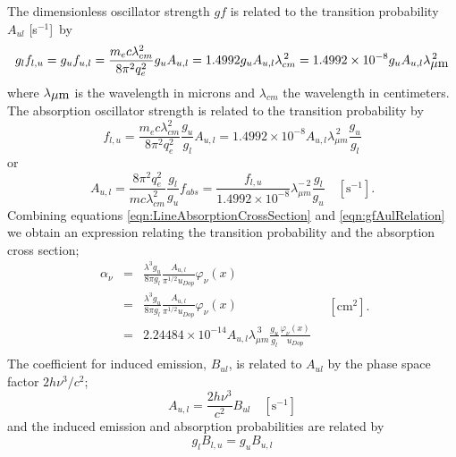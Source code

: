 The dimensionless oscillator strength $gf$ is related to the transition
probability $A_{ul}$ [s$^{-1}$]~by
\begin{equation}
{g_l}{f_{l,u}} = {g_u}{f_{u,l}} = \frac{{{m_e}c\lambda _{cm}^2}}{{8{\pi
^2}q_e^2}}{g_u}{A_{u,l}} = 1.4992{g_u}{A_{u,l}}\lambda _{cm}^{\,2} = 1.4992
\times {10^{ - 8}}{g_u}{A_{u,l}}\lambda _{\hbox{$\mu$m}}^{\,2}
\end{equation}
where $\lambda_{\hbox{$\mu$m}}$ is the wavelength in microns and $\lambda_{cm}$ the wavelength in centimeters.
The absorption oscillator strength is related to the
transition probability by
\begin{equation}
\label{eqn:gfAulRelation}
{f_{l,u}} = \frac{{{m_e}c\lambda _{cm}^2}}{{8{\pi
^2}q_e^2}}\frac{{{g_u}}}{{{g_l}}}{A_{u,l}} = 1.4992 \times {10^{ -
8}}{A_{u,l}}\lambda _{\mu m}^{\,2}\frac{{{g_u}}}{{{g_l}}}
\end{equation}
or
\begin{equation}
{A_{u,l}} = \frac{{8{\pi ^2}q_e^2}}{{mc\lambda
_{cm}^2}}\frac{{{g_l}}}{{{g_u}}}{f_{abs}} = \frac{{{f_{l,u}}}}{{1.4992 \times
{{10}^{ - 8}}}}\lambda _{\mu m}^{ - \,2}\frac{{{g_l}}}{{{g_u}}}\quad
[\mathrm{s}^{-1}].
\end{equation}
Combining equations \ref{eqn:LineAbsorptionCrossSection}
and \ref{eqn:gfAulRelation} we obtain an expression relating the
transition probability and the absorption cross section;
\begin{equation}
\begin{array}{ccl}
 {\alpha _\nu }& =& \frac{{{\lambda ^3}{g_u}}}{{8\pi
{g_l}}}\frac{{{A_{u,l}}}}{{{\pi ^{1/2}}{u_{Dop}}}}{\varphi _\nu }\left(
x \right) \\
&=& \frac{{{\lambda ^3}{g_u}}}{{8\pi {g_l}}}\frac{{{A_{u,l}}}}{{{\pi
^{1/2}}{u_{Dop}}}}{\varphi _\nu }\left( x \right) \\
&=& 2.24484 \times {10^{ - 14}}{A_{u,l}}\lambda _{\mu
m}^{\,3}\frac{{{g_u}}}{{{g_l}}}\frac{{{\varphi _\nu }\left( x
\right)}}{{{u_{Dop}}}} \\
 \end{array}
\quad  [\mathrm{cm}^2].
\end{equation}
The coefficient for induced emission,
$B_{ul}$, is related to $A_{ul}$ by the phase
space factor $2h{\nu ^3}/{c^2}$;
\begin{equation}
{A_{u,l}} = \frac{{2h{\nu ^3}}}{{{c^2}}}{B_{ul}}
\quad [\mathrm{s}^{-1}]
\end{equation}
and the induced emission and absorption probabilities are related by
\begin{equation}
{g_l}{B_{l,u}} = {g_u}{B_{u,l}}
\end{equation}

